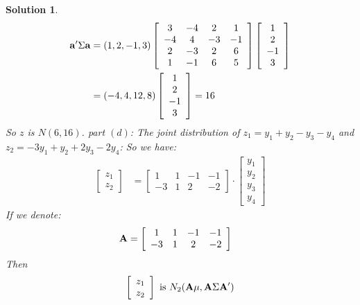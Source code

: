 \documentclass[11pt]{article}
\newtheorem{sol}{Solution}
\begin{document}
\begin{sol}
	\begin{align*}
		{\bf a}'\Sigma {\bf a} &= (1, 2, -1, 3)\left[\begin{array}{cccc} 3&-4&2& 1\\ -4&4&-3&-1 \\ 2&-3&2&6\\ 1&-1&6&5 \end{array}\right]\left[\begin{array}{c}1\\ 2\\ -1\\ 3\end{array}\right]\\
		&= (-4, 4, 12, 8)\left[\begin{array}{c}1\\ 2\\ -1\\ 3\end{array}\right] = 16
	\end{align*}
	So $z$ is $N(6, 16)$.\vskip 2mm
	part $(d)$:\vskip 2mm
	The joint distribution of $z_1 = y_1 + y_2 - y_3 - y_4$ and $z_2 = -3y_1 + y_2 + 2y_3 - 2y_4$:\vskip 2mm
	So we have:
	\begin{align*}
		\left[\begin{array}{c} z_1\\ z_2\end{array}\right] &= \left[\begin{array}{cccc}1&1&-1&-1\\ -3&1&2&-2 \end{array}\right]\cdot \left[\begin{array}{c} y_1\\ y_2\\ y_3\\ y_4\end{array}\right]
	\end{align*}
	If we denote:
	\begin{align*}
		{\bf A} &= \left[\begin{array}{cccc}1&1&-1&-1\\ -3&1&2&-2 \end{array}\right]
	\end{align*}	
	Then
	\begin{align*}
		\left[\begin{array}{c} z_1\\ z_2\end{array}\right] \text{ is } N_2({\bf A}{\bf \mu}, {\bf A}\Sigma{\bf A}')
	\end{align*}

\end{sol}
\end{document}
